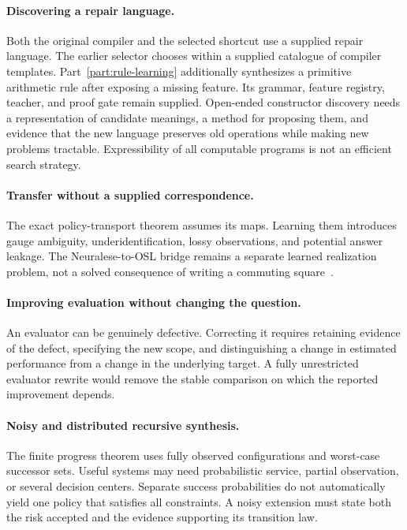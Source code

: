 \documentclass[11pt,letterpaper]{article}
\theoremstyle{plain}
\theoremstyle{definition}
\begin{document}
\paragraph{Discovering a repair language.}
Both the original compiler and the selected shortcut use a supplied repair language. The earlier selector chooses within a supplied catalogue of compiler templates. Part~\ref{part:rule-learning} additionally synthesizes a primitive arithmetic rule after exposing a missing feature. Its grammar, feature registry, teacher, and proof gate remain supplied. Open-ended constructor discovery needs a representation of candidate meanings, a method for proposing them, and evidence that the new language preserves old operations while making new problems tractable. Expressibility of all computable programs is not an efficient search strategy.

\paragraph{Transfer without a supplied correspondence.}
The exact policy-transport theorem assumes its maps. Learning them introduces gauge ambiguity, underidentification, lossy observations, and potential answer leakage. The Neuralese-to-OSL bridge remains a separate learned realization problem, not a solved consequence of writing a commuting square~\cite{neuralese}.

\paragraph{Improving evaluation without changing the question.}
An evaluator can be genuinely defective. Correcting it requires retaining evidence of the defect, specifying the new scope, and distinguishing a change in estimated performance from a change in the underlying target. A fully unrestricted evaluator rewrite would remove the stable comparison on which the reported improvement depends.

\paragraph{Noisy and distributed recursive synthesis.}
The finite progress theorem uses fully observed configurations and worst-case successor sets. Useful systems may need probabilistic service, partial observation, or several decision centers. Separate success probabilities do not automatically yield one policy that satisfies all constraints. A noisy extension must state both the risk accepted and the evidence supporting its transition law.
\end{document}

